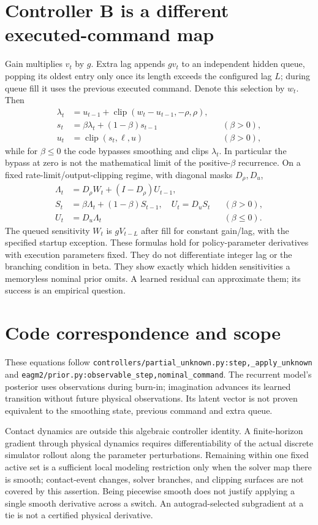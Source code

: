 \documentclass{article}
\begin{document}
\section{Controller B is a different executed-command map}
Gain multiplies $v_t$ by $g$. Extra lag appends $gv_t$ to an independent hidden queue, popping its oldest entry only once its length exceeds the configured lag $L$; during queue fill it uses the previous executed command. Denote this selection by $w_t$. Then
\begin{align}
\lambda_t&=u_{t-1}+\operatorname{clip}(w_t-u_{t-1},-\rho,\rho),\\
s_t&=\beta\lambda_t+(1-\beta)s_{t-1} &&(\beta>0),\\
u_t&=\operatorname{clip}(s_t,\ell,u) &&(\beta>0),
\end{align}
while for $\beta\le0$ the code bypasses smoothing and clips $\lambda_t$. In particular the bypass at zero is not the mathematical limit of the positive-$\beta$ recurrence.
On a fixed rate-limit/output-clipping regime, with diagonal masks $D_\rho,D_u$,
\begin{align}
\Lambda_t&=D_\rho W_t+(I-D_\rho)U_{t-1},\\
S_t&=\beta\Lambda_t+(1-\beta)S_{t-1},\quad U_t=D_uS_t &&(\beta>0),\\
U_t&=D_u\Lambda_t &&(\beta\le0).
\end{align}
The queued sensitivity $W_t$ is $gV_{t-L}$ after fill for constant gain/lag, with the specified startup exception. These formulas hold for policy-parameter derivatives with execution parameters fixed. They do not differentiate integer lag or the branching condition in beta. They show exactly which hidden sensitivities a memoryless nominal prior omits. A learned residual can approximate them; its success is an empirical question.

\section{Code correspondence and scope}
These equations follow \texttt{controllers/partial\_unknown.py:step,\_apply\_unknown} and \texttt{eagm2/prior.py:observable\_step,nominal\_command}. The recurrent model's posterior uses observations during burn-in; imagination advances its learned transition without future physical observations. Its latent vector is not proven equivalent to the smoothing state, previous command and extra queue.

Contact dynamics are outside this algebraic controller identity. A finite-horizon gradient through physical dynamics requires differentiability of the actual discrete simulator rollout along the parameter perturbations. Remaining within one fixed active set is a sufficient local modeling restriction only when the solver map there is smooth; contact-event changes, solver branches, and clipping surfaces are not covered by this assertion. Being piecewise smooth does not justify applying a single smooth derivative across a switch. An autograd-selected subgradient at a tie is not a certified physical derivative.
\end{document}
